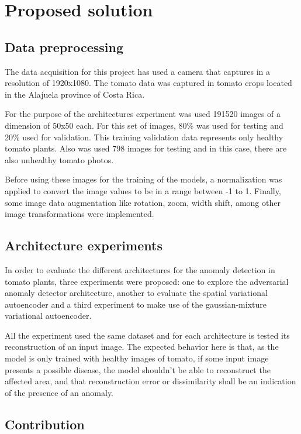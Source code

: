 \chapter{Proposed solution}
\label{ch:solution}

\section{Data preprocessing}

The data acquisition for this project has used a camera that captures in a resolution of 1920x1080. The tomato data was captured in tomato crops located in the Alajuela province of Costa Rica.

For the purpose of the architectures experiment was used 191520 images of a dimension of 50x50 each. For this set of images, 80\% was used for testing and 20\% used for validation. This training validation data represents only healthy tomato plants. Also was used 798 images for testing and in this case, there are also unhealthy tomato photos.

Before using these images for the training of the models, a normalization was applied to convert the image values to be in a range between -1 to 1. Finally, some image data augmentation like rotation, zoom, width shift, among other image transformations were implemented.

\section{Architecture experiments}

In order to evaluate the different architectures for the anomaly detection in tomato plants, three experiments were proposed: one to explore the adversarial anomaly detector architecture, another to evaluate the spatial variational autoencoder and a third experiment to make use of the gaussian-mixture variational autoencoder.

All the experiment used the same dataset and for each architecture is tested its reconstruction of an input image. The expected behavior here is that, as the model is only trained with healthy images of tomato, if some input image presents a possible disease, the model shouldn't be able to reconstruct the affected area, and that reconstruction error or dissimilarity shall be an indication of the presence of an anomaly.

\section{Contribution}

